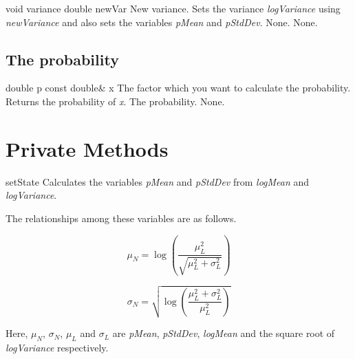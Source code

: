 \setNormalInstance
\printMethodWithOneParam
{void}
{variance}
{double}
{newVar}
{New variance.}
{Sets the variance {\em logVariance} using {\em newVariance} and also
sets the variables {\em pMean} and {\em pStdDev}.}
{None.}
{None.}

\vspace*{10mm}

\subsection{The probability}

\setConstInstance
\printMethodWithOneParam
{double}
{p}
{const double\&}
{x}
{The factor which you want to calculate the probability.}
{Returns the probability of {\em x}.}
{The probability.}
{None.}

\clearpage

\section{Private Methods}

\setNormalInstance
\printEmptyMethod
{setState}
{Calculates the variables {\em pMean} and {\em pStdDev} from {\em
logMean} and {\em logVariance}.}

\noindent
The relationships among these variables are as follows.

\begin{equation}
\mu_N = \log{\left( \frac{\mu_L^2}{\sqrt{\mu_L^2 + \sigma_L^2}}
\right)}
\end{equation}

\begin{equation}
\sigma_N = \sqrt{ \log{\left( \frac{\mu_L^2 + \sigma_L^2}{\mu_L^2}
\right)} }
\end{equation}

\noindent
Here, $\mu_N$, $\sigma_N$, $\mu_L$ and $\sigma_L$ are {\em pMean},
{\em pStdDev}, {\em logMean} and the square root of {\em logVariance} respectively.